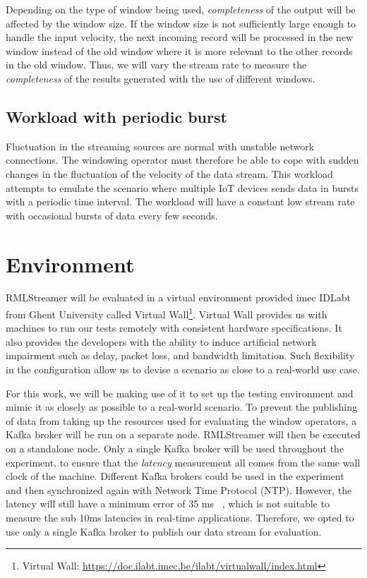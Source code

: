 Depending on the type of window being used, \emph{completeness} of the output will be
affected by the window size. If the window size is not sufficiently large enough to handle 
the input velocity, the next incoming record will be processed in the new window instead of 
the old window where it is more relevant to the other records in the old window. Thus, 
we will vary the stream rate to measure the \emph{completeness} of the results generated 
with the use of different windows.

\subsection{Workload with periodic burst}
Fluctuation in the streaming sources are normal with unstable network connections. 
The windowing operator must therefore be able to cope with sudden changes in the 
fluctuation of the velocity of the data stream. This workload attempts to emulate 
the scenario where multiple IoT devices sends data in bursts with a periodic 
time interval. The workload will have a constant low stream rate with occasional 
bursts of data every few seconds. 


\section{Environment}

RMLStreamer will be evaluated in a virtual environment provided imec IDLabt from Ghent 
University called Virtual Wall\footnote{Virtual Wall: \href{https://doc.ilabt.imec.be/ilabt/virtualwall/index.html}{https://doc.ilabt.imec.be/ilabt/virtualwall/index.html}}.
Virtual Wall provides us with machines to run our tests remotely with consistent 
hardware specifications. It also provides the developers with the ability to induce 
artificial network impairment such as delay, packet loss, and bandwidth limitation. Such 
flexibility in the configuration allow us to devise a scenario as close to a real-world use case. 

For this work, we will be making use of it to set up the testing 
environment and mimic it as closely as possible to a real-world scenario. 
To prevent the publishing of data from taking up the resources used for evaluating the 
window operators, a Kafka broker will be run on a separate node. RMLStreamer will then be 
executed on a standalone node. Only a single Kafka broker will be used throughout the experiment, 
to ensure that the \emph{latency} measurement all comes from the same wall clock of the machine. 
Different Kafka brokers could be used in the experiment and then synchronized again 
with Network Time Protocol (NTP). However, the latency will still have a minimum
error of 35 ms~\cite{ntp_latency} ,
which is not suitable to measure the sub 10ms latencies in 
real-time applications. Therefore, we opted to use only a single Kafka broker to publish
our data stream for evaluation.





